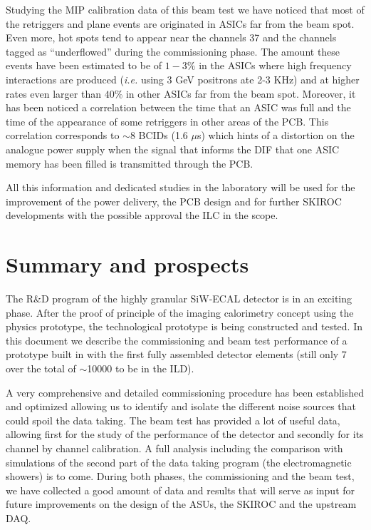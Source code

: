 \documentclass[a4paper,11pt]{article}
\begin{document}
Studying the MIP calibration data of this beam test we have noticed that most of the retriggers and plane events are originated 
in
ASICs far from the beam spot. Even more, hot spots tend to appear near the channels 37 and the channels tagged as ``underflowed'' 
during
the commissioning phase. The amount these events have been estimated to be of $1-3\%$ in the ASICs where high frequency
interactions are produced ({\it i.e.} using 3 GeV positrons ate 2-3 KHz) and at higher rates even larger than $40\%$ in other 
ASICs far from the beam spot.
Moreover, it has been noticed a correlation between the time that an ASIC was full and the time of the appearance of some 
retriggers in other areas of the PCB. 
This correlation corresponds to $\sim8$ BCIDs (1.6 $\mu$s) which hints
of a distortion on the analogue power supply when
the signal that informs the DIF that one ASIC memory has been filled is transmitted through the PCB.


All this information and dedicated studies in the laboratory will be used for the
improvement of the power delivery, the PCB design and for further SKIROC developments 
with the possible approval the ILC in the scope.


\section{Summary and prospects}
\label{sec:prospects}

The R\&D program of the highly granular SiW-ECAL detector is in an exciting phase. 
After the proof of principle of the imaging calorimetry concept using the physics prototype, the 
technological prototype is being constructed and tested. In this document we describe the commissioning and
beam test performance of a prototype built in with the first fully assembled
detector elements (still only 7 over the total of $\sim$10000 to be in the ILD).

A very comprehensive and detailed commissioning procedure has been established and optimized
allowing us to identify and isolate the different noise sources that could spoil the data taking.
The beam test has provided a lot of useful data, allowing first for the study of 
the performance of the detector and secondly 
for its channel by channel calibration. 
A full analysis including the comparison with simulations of the 
second part of the data taking program (the electromagnetic showers) is to come.
During both phases, the commissioning and the beam test,
we have collected a good amount of data and results
that will serve as input for future improvements on
the design of the ASUs, the SKIROC and the upstream DAQ.
\end{document}
